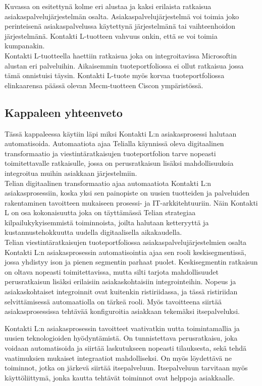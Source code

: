 \documentclass[finnish,12pt,a4paper,pdftex]{article}
\begin{document}
Kuvassa on esitettynä kolme eri alustaa ja kaksi erilaista ratkaisua asiakaspalvelujärjestelmän osalta. Asiakaspalvelujärjestelmä voi toimia joko perinteisenä asiakaspalvelussa käytettynä järjestelmänä tai vaihteenhoidon järjestelmänä. Kontakti L-tuotteen vahvuus onkin, että se voi toimia kumpanakin.\\

Kontakti L-tuotteella haettiin ratkaisua joka on integroitavissa Microsoftin alustan eri palveluihin. Aikaisemmin tuoteportfoliossa ei ollut ratkaisua jossa tämä onnistuisi täysin. Kontakti L-tuote myös korvaa tuoteportfoliossa elinkaarensa päässä olevan Mecm-tuotteen Ciscon ympäristössä.\\

\subsection{Kappaleen yhteenveto}

Tässä kappaleessa käytiin läpi miksi Kontakti L:n asiakasprosessi halutaan automatisoida. Automaatiota ajaa Telialla käynnissä oleva digitaalinen transformaatio ja viestintäratkaisujen tuoteportfolion tarve nopeasti toimitettavalle ratkaisulle, jossa on perusratkaisun lisäksi mahdollisuuksia integroitua muihin asiakkaan järjestelmiin.\\

Telian digitaalinen transformaatio ajaa automaatiota Kontakti L:n asiakasprosessiin, koska yksi sen painopiste on uusien tuotteiden ja palveluiden rakentaminen tavoitteen mukaiseen prosessi- ja IT-arkkitehtuuriin. Näin Kontakti L on osa kokonaisuutta joka on täyttämässä Telian strategiaa kilpailukykyisemmistä toiminnoista, joilta halutaan ketteryyttä ja kustannustehokkuutta uudella digitaalisella aikakaudella.\\

Telian viestintäratkaisujen tuoteportfoliossa asiakaspalvelujärjestelmien osalta Kontakti L:n asiakasprosessin automatisointia ajaa sen rooli keskisegmentissä, jossa yhdistyy ison ja pienen segmentin parhaat puolet. Keskisegmentin ratkaisun on oltava nopeasti toimitettavissa, mutta silti tarjota mahdollisuudet perusratkaisun lisäksi erilaisiin asiakaskohtaisiin integrointeihin. Nopeus ja asiakaskohtaiset integroinnit ovat kuitenkin ristiriidassa, ja tässä ristiriidan selvittämisessä automaatiolla on tärkeä rooli. Myös tavoitteena siirtää asiakasprosessissa tehtävää konfiguroitia asiakkaan tekemäksi itsepalveluksi.

Kontakti L:n asiakasprosessin tavoitteet vaativatkin uutta toimintamallia ja uusien teknologioiden hyödyntämistä. On tunnistettava perusratkaisu, joka voidaan automatisoida ja siirtää laskutukseen nopeasti tilauksesta, sekä tehdä vaatimuksien mukaiset integraatiot mahdolliseksi. On myös löydettävä ne toiminnot, jotka on järkevä siirtää itsepalveluun. Itsepalveluun tarvitaan myös käyttöliittymä, jonka kautta tehtävät toiminnot ovat helppoja asiakkaalle.\\
\end{document}
